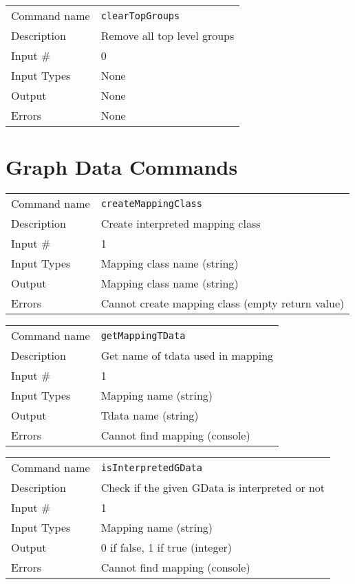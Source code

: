 \bigskip

\noindent
\begin{tabular}{l|p{5in}}
\hline
Command name & {\tt clearTopGroups} \\
Description  & Remove all top level groups \\
Input \#     & 0 \\
Input Types  & None \\
Output       & None \\
Errors       & None \\
\hline
\end{tabular}

\section{Graph Data Commands}

\noindent
\begin{tabular}{l|p{5in}}
\hline
Command name & {\tt createMappingClass} \\
Description  & Create interpreted mapping class \\
Input \#     & 1 \\
Input Types  & Mapping class name (string) \\
Output       & Mapping class name (string) \\
Errors       & Cannot create mapping class (empty return value) \\
\hline
\end{tabular}

\bigskip

\noindent
\begin{tabular}{l|p{5in}}
\hline
Command name & {\tt getMappingTData} \\
Description  & Get name of tdata used in mapping \\
Input \#     & 1 \\
Input Types  & Mapping name (string) \\
Output       & Tdata name (string) \\
Errors       & Cannot find mapping (console) \\
\hline
\end{tabular}

\bigskip

\noindent
\begin{tabular}{l|p{5in}}
\hline
Command name & {\tt isInterpretedGData} \\
Description  & Check if the given GData is interpreted or not \\
Input \#     & 1 \\
Input Types  & Mapping name (string) \\
Output       & 0 if false, 1 if true (integer) \\
Errors       & Cannot find mapping (console) \\
\hline
\end{tabular}

